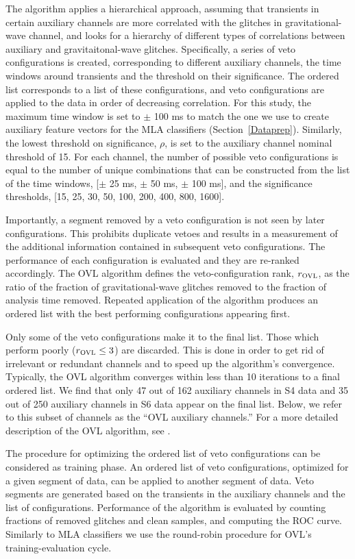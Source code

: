 \documentclass[prd, twocolumn, lengthcheck, superscriptaddress, showpacs, letterpaper, nofootinbib]{revtex4-1}
\newcommand\OVLrank{r_{\textsc{OVL}}}
\begin{document}
The algorithm applies a hierarchical approach, assuming that transients in certain auxiliary channels are more correlated with the glitches in gravitational-wave channel, and looks for a hierarchy of different types of correlations between auxiliary and gravitaitonal-wave glitches. Specifically, a series of veto configurations is created, corresponding to different auxiliary channels, the time windows around transients and the threshold on their significance. The ordered list corresponds to a list of these configurations, and veto configurations are applied to the data in order of decreasing correlation. For this study, the maximum time window is set to $\pm$ 100 ms to match the one we use to create auxiliary feature vectors for the MLA classifiers (Section~\ref{Dataprep}). Similarly, the lowest threshold on significance, $\rho$, is set to the auxiliary channel nominal threshold of 15. For each channel, the number of possible veto configurations is equal to the number of unique combinations that can be constructed from the list of the time windows, [$\pm$ 25 ms, $\pm$ 50 ms, $\pm$ 100 ms], and  the significance thresholds, [15, 25, 30, 50, 100, 200, 400, 800, 1600]. 

Importantly, a segment removed by a veto configuration is not seen by later configurations. This prohibits duplicate vetoes and results in a measurement of the additional information contained in subsequent veto configurations. The performance of each configuration is evaluated and they are re-ranked accordingly. The \ac{OVL} algorithm defines the veto-configuration rank, $\OVLrank$, as the ratio of the fraction of gravitational-wave glitches removed to the fraction of analysis time removed. Repeated application of the algorithm produces an ordered list with the best performing configurations appearing first. 

Only some of the veto configurations make it to the final list. Those which perform poorly ($\OVLrank \le 3$) are discarded. This is done in order to get rid of irrelevant or redundant channels and to speed up the algorithm's convergence. Typically, the \ac{OVL} algorithm converges within less than 10 iterations to a final ordered list. We find that only 47 out of 162 auxiliary channels in S4 data and 35 out of 250 auxiliary channels in S6 data appear on the final list. Below, we refer to this subset of channels as the ``{OVL} auxiliary channels.'' For a more detailed description of the OVL algorithm, see \cite{OVL}.

The procedure for optimizing the ordered list of veto configurations can be considered as training phase. An ordered list of veto
configurations, optimized  for a given segment of data, can be  applied
to another segment of data. Veto segments are generated based on the
transients in the auxiliary channels and the list of configurations.
Performance of the algorithm is evaluated by counting fractions of
removed glitches and clean samples, and computing the \ac{ROC} curve. Similarly to \ac{MLA} classifiers
we use the round-robin procedure for \ac{OVL}'s training-evaluation cycle.
\end{document}
